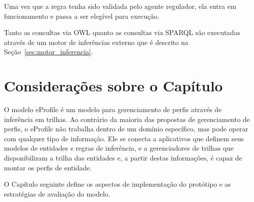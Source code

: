 Uma vez que a regra tenha sido validada pelo agente regulador, ela entra em funcionamento e passa a ser elegível para execução.

Tanto as consultas via OWL quanto as consultas via SPARQL são executadas através de um motor de inferências externo que é descrito na Seção~\ref{sec:motor_inferencia}.

\section{Considerações sobre o Capítulo}

O modelo eProfile é um modelo para gerenciamento de perfis através de inferência em trilhas. Ao contrário da maioria das propostas de gerenciamento de perfis, o eProfile não trabalha dentro de um domínio específico, mas pode operar com qualquer tipo de informação. Ele se conecta a aplicativos que definem seus modelos de entidades e regras de inferência, e a gerenciadores de trilhas que disponibilizam a trilha das entidades e, a partir destas informações, é capaz de montar os perfis de entidade.

O Capítulo seguinte define os aspectos de implementação do protótipo e as estratégias de avaliação do modelo.
